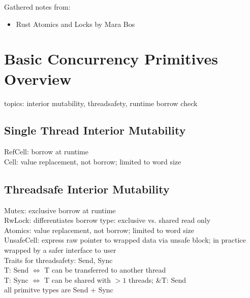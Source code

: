 \documentclass[8pt]{extarticle}
\begin{document}

  
\begin{multicols*}{2}

  Gathered notes from:
  \begin{itemize}
  \item Rust Atomics and Locks by Mara Bos \cite{rustatomicsbook}
  \end{itemize}
  
  \section{Basic Concurrency Primitives Overview}
  topics: interior mutability, threadsafety, runtime borrow check

  \subsection{Single Thread Interior Mutability}
  RefCell: borrow at runtime\\
  Cell: value replacement, not borrow; limited to word size
  
  \subsection{Threadsafe Interior Mutability}
  Mutex: exclusive borrow at runtime\\
  RwLock: differentiates borrow type: exclusive vs. shared read only\\
  Atomics: value replacement, not borrow; limited to word size\\

  UnsafeCell: express raw pointer to wrapped data via unsafe block; in practice wrapped by a safer interface to user\\

  Traits for threadsafety: Send, Sync\\
  T: Send $\iff$ T can be transferred to another thread\\
  T: Sync $\iff$ T can be shared with $>1$ threads; \&T: Send\\
  all primitve types are Send + Sync\\
  

\end{multicols*}
\end{document}
